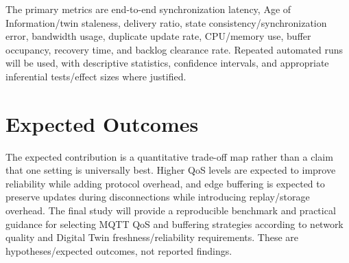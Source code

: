 The primary metrics are end-to-end synchronization latency, Age of Information/twin staleness, delivery ratio, state consistency/synchronization error, bandwidth usage, duplicate update rate, CPU/memory use, buffer occupancy, recovery time, and backlog clearance rate. Repeated automated runs will be used, with descriptive statistics, confidence intervals, and appropriate inferential tests/effect sizes where justified.

\section{Expected Outcomes}
The expected contribution is a quantitative trade-off map rather than a claim that one setting is universally best. Higher QoS levels are expected to improve reliability while adding protocol overhead, and edge buffering is expected to preserve updates during disconnections while introducing replay/storage overhead. The final study will provide a reproducible benchmark and practical guidance for selecting MQTT QoS and buffering strategies according to network quality and Digital Twin freshness/reliability requirements. These are hypotheses/expected outcomes, not reported findings.
